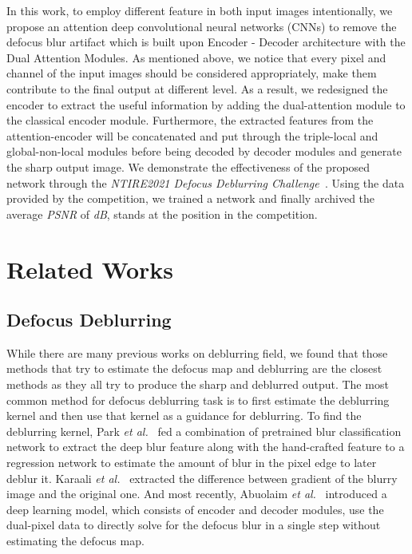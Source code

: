 \documentclass[final]{cvpr}
\begin{document}
In this work, to employ different feature in both input images intentionally, we propose an attention deep convolutional neural networks (CNNs) to remove the defocus blur artifact which is built upon Encoder - Decoder architecture with the Dual Attention Modules. As mentioned above, we notice that every pixel and channel of the input images should be considered appropriately, make them contribute to the final output at different level.  As a result, we redesigned the encoder to extract the useful information by adding the dual-attention module to the classical encoder module. Furthermore, the extracted features from the attention-encoder will be concatenated and put through the triple-local and global-non-local modules before being decoded by decoder modules and generate the sharp output image. We demonstrate the effectiveness of the proposed network through the \textit{NTIRE2021 Defocus Deblurring Challenge~\cite{ntire}}. Using the data provided by the competition, we trained a network and finally archived the average \textit{PSNR} of  \textit{dB}, stands at the  position in the competition.

\section{Related Works}

\subsection{Defocus Deblurring}

While there are many previous works on deblurring field, we found that those methods that try to estimate the defocus map and deblurring are the closest methods as they all try to produce the sharp and deblurred output. The most common method for defocus deblurring task is to first estimate the deblurring kernel and then use that kernel as a guidance for deblurring. To find the deblurring kernel, Park \textit{et al.}~\cite{park} fed a combination of pretrained blur classification network to extract the deep blur feature along with the hand-crafted feature to a regression network to estimate the amount of blur in the pixel edge to later deblur it. Karaali \textit{et al.}~\cite{karaali} extracted the difference between gradient of the blurry image and the original one. And most recently, Abuolaim \textit{et al.}~\cite{abuolaim2020defocus}  introduced a deep learning model, which consists of encoder and decoder modules, use the dual-pixel data to directly solve for the defocus blur in a single step without estimating the defocus map.
\end{document}
